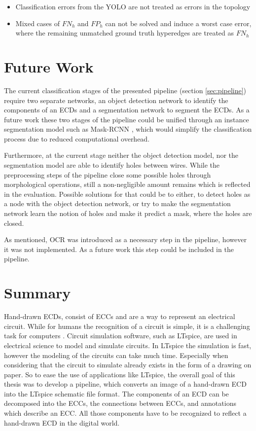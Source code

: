 \begin{itemize}
    \item Classification errors from the \ac{YOLO} are not treated as errors in the topology
    \item Mixed cases of $FN_h$ and $FP_h$ can not be solved and induce a worst case error, where the remaining unmatched ground truth hyperedges are treated as $FN_h$
\end{itemize}

\section{Future Work}

The current classification stages of the presented pipeline (section \ref{sec:pipeline}) require two separate networks, an object detection network to identify the components of an \acp{ECD} and a segmentation network to segment the \acp{ECD}.
As a future work these two stages of the pipeline could be unified through an instance segmentation model such as Mask-RCNN \cite{mask_rcnn}, which would simplify the classification process due to reduced computational overhead.

Furthermore, at the current stage neither the object detection model, nor the segmentation model are able to identify holes between wires.
While the preprocessing steps of the pipeline close some possible holes through morphological operations, still a non-negligible amount remains which is reflected in the evaluation.
Possible solutions for that could be to either, to detect holes as a node with the object detection network, or try to make the segmentation network learn the notion of holes and make it predict a mask, where the holes are closed.

As mentioned, \ac{OCR} was introduced as a necessary step in the pipeline, however it was not implemented.
As a future work this step could be included in the pipeline.

\section{Summary}

Hand-drawn \acfp{ECD}, consist of \acfp{ECC} and are a way to represent an electrical circuit.
While for humans the recognition of a circuit is simple, it is a challenging task for computers \cite{ecd_knnfull} \cite{ecd_anngeo}.
Circuit simulation software, such as LTspice, are used in electrical science to model and simulate circuits.
In LTspice the simulation is fast, however the modeling of the circuits can take much time.
Especially when considering that the circuit to simulate already exists in the form of a drawing on paper.
So to ease the use of applications like LTspice, the overall goal of this thesis was to develop a pipeline, which converts an image of a hand-drawn \ac{ECD} into the LTspice schematic file format.
The components of an \ac{ECD} can be decomposed into the \acp{ECC}, the connections between \acp{ECC}, and annotations which describe an \ac{ECC}.
All those components have to be recognized to reflect a hand-drawn \ac{ECD} in the digital world.


